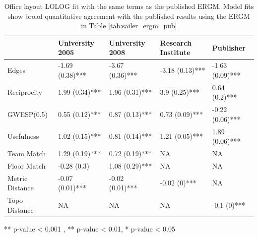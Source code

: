 \documentclass[
]{statsoc}
\begin{document}
\begin{table}

\caption{\label{tab:unnamed-chunk-3}\label{tab:sailer_lolog_pub} Office layout LOLOG fit with the same terms as the published ERGM. Model fits show broad quantitative agreement with the published results using the ERGM in Table \ref{tab:sailer_ergm_pub}}
\centering
\begin{threeparttable}
\begin{tabular}[t]{lllll}
\toprule
  & University 2005 & University 2008 & Research Institute & Publisher\\
\midrule
\rowcolor{gray!6}  Edges & -1.69 (0.38)*** & -3.67 (0.36)*** & -3.18 (0.13)*** & -1.63 (0.09)***\\
Reciprocity & 1.99 (0.34)*** & 1.96 (0.31)*** & 3.9 (0.25)*** & 0.64 (0.2)***\\
\rowcolor{gray!6}  GWESP(0.5) & 0.55 (0.12)*** & 0.87 (0.13)*** & 0.73 (0.09)*** & -0.22 (0.06)***\\
Usefulness & 1.02 (0.15)*** & 0.81 (0.14)*** & 1.21 (0.05)*** & 1.89 (0.06)***\\
\rowcolor{gray!6}  Team Match & 1.29 (0.19)*** & 0.72 (0.19)*** & NA & NA\\
\addlinespace
Floor Match & -0.28 (0.3) & 1.08 (0.29)*** & NA & NA\\
\rowcolor{gray!6}  Metric Distance & -0.07 (0.01)*** & -0.02 (0.01)*** & -0.02 (0)*** & NA\\
Topo Distance & NA & NA & NA & -0.1 (0)***\\
\bottomrule
\end{tabular}
\begin{tablenotes}
\item *** p-value < 0.001 , ** p-value < 0.01, * p-value < 0.05
\end{tablenotes}
\end{threeparttable}
\end{table}
\end{document}
